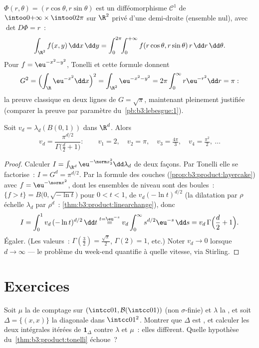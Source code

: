 \begin{example}\label{ex:b3:product:polar}
$\Phi(r, \theta) = (r\cos\theta, r\sin\theta)$ est un
difféomorphisme $\mathcal C^1$ de
$\intoo0{+\infty}\times\intoo0{2\pi}$ sur $\R^2$ privé d'une
demi-droite (ensemble nul), avec $\det D\Phi = r$~:
\[
\int_{\R^2}f(x, y)\,\dd x\,\dd y
= \int_0^{2\pi}\!\!\int_0^{+\infty}
f(r\cos\theta, r\sin\theta)\,r\,\dd r\,\dd\theta .
\]
Pour $f = \eu^{-x^2-y^2}$, Tonelli et cette formule donnent
\[
G^2 = \Bigl(\int_\R \eu^{-x^2}\dd x\Bigr)^2
= \int_{\R^2}\eu^{-x^2-y^2}
= 2\pi\int_0^\infty r\eu^{-r^2}\dd r = \pi:
\]
la preuve classique en deux lignes de $G = \sqrt\pi$,
maintenant pleinement justifiée (comparer la preuve par
paramètre du~\cref{pb:b3:lebesgue:1}).
\end{example}

\begin{theorem}
\label{thm:b3:product:ballvolume}
Soit $v_d = \lambda_d(B(0,1))$ dans $\R^d$. Alors
\[
v_d = \frac{\pi^{d/2}}{\Gamma\bigl(\frac d2 + 1\bigr)} :
\qquad
v_1 = 2,\quad v_2 = \pi,\quad v_3 = \tfrac{4\pi}3,\quad
v_4 = \tfrac{\pi^2}2,\ \dots
\]
\end{theorem}

\begin{proof}
Calculer $I = \int_{\R^d}\eu^{-\norm x_2^2}\dd\lambda_d$ de
deux façons. Par Tonelli elle se factorise~: $I = G^d =
\pi^{d/2}$. Par la formule des couches
(\cref{prop:b3:product:layercake}) avec $f = \eu^{-
\norm x^2}$, dont les ensembles de niveau sont des boules~:
$\{f > t\} = B\bigl(0, \sqrt{-\ln t}\bigr)$ pour $0 < t < 1$,
de  $v_d(-\ln t)^{d/2}$ (la dilatation par $\rho$
échelle $\lambda_d$ par $\rho^d$~:
\cref{thm:b3:product:linearchange}), donc
\[
I = \int_0^1 v_d\,(-\ln t)^{d/2}\,\dd t
\overset{t = \eu^{-s}}{=}
v_d\int_0^\infty s^{d/2}\eu^{-s}\,\dd s
= v_d\,\Gamma\Bigl(\frac d2 + 1\Bigr).
\]
Égaler. (Les valeurs~: $\Gamma(\frac32) = \frac{\sqrt\pi}2$,
$\Gamma(2) = 1$, etc.) Noter $v_d \to 0$ lorsque $d \to
\infty$ --- le problème du week-end quantifie à quelle
vitesse, via Stirling.
\end{proof}

\section{Exercices}

\begin{exercise}[$\star$]\label{exo:b3:product:1}
Soit $\mu$ la  de comptage sur $(\intcc01, \mathcal
B(\intcc01))$ (non $\sigma$-finie) et $\lambda$ la , et soit $\Delta = \{(x,x)\}$ la diagonale dans
$\intcc01^2$. Montrer que $\Delta$ est , et calculer
les deux intégrales itérées de $\mathbf 1_\Delta$ contre
$\lambda$ et $\mu$~: elles diffèrent. Quelle hypothèse
du~\cref{thm:b3:product:tonelli} échoue~?
\end{exercise}

